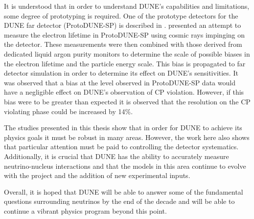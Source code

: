 It is understood that in order to understand DUNE's capabilities and limitations, some degree of prototyping is required.
One of the prototype detectors for the DUNE far detector (ProtoDUNE-SP) is described in .
 presented an attempt to measure the electron lifetime in ProtoDUNE-SP using cosmic rays impinging on the detector.
These measurements were then combined with those derived from dedicated liquid argon purity monitors to determine the scale of possible biases in the electron lifetime and the particle energy scale.
This bias is propagated to far detector simulation in order to determine its effect on DUNE's sensitivities.
It was observed that a bias at the level observed in ProtoDUNE-SP data would have a negligible effect on DUNE's observation of CP violation.
However, if this bias were to be greater than expected it is observed that the resolution on the CP violating phase could be increased by 14\%.

The studies presented in this thesis show that in order for DUNE to achieve its physics goals it must be robust in many areas.
However, the work here also shows that particular attention must be paid to controlling the detector systematics.
Additionally, it is crucial that DUNE has the ability to accurately measure neutrino-nucleus interactions and that the models in this area continue to evolve with the project and the addition of new experimental inputs.

Overall, it is hoped that DUNE will be able to answer some of the fundamental questions surrounding neutrinos by the end of the decade and will be able to continue a vibrant physics program beyond this point.
